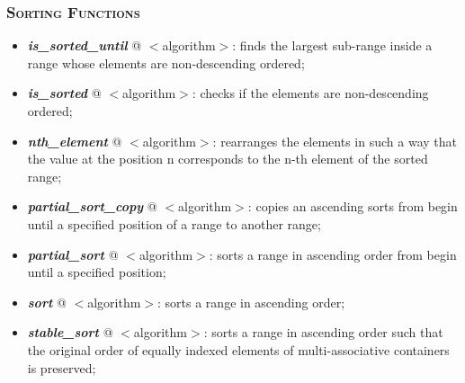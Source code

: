 \documentclass[10pt]{article}
\begin{document}
\begin{multicols*}{5}
{\subsubsection*{\textsc{Sorting Functions}} 
\begin{itemize}[leftmargin=*,topsep=0.25pt]
  \setlength\itemsep{-1.8pt}
	\item  \emph{\textbf{is\_sorted\_until}} @ $<$algorithm$>$: finds the largest sub-range inside a range whose elements are non-descending ordered;
	\item  \emph{\textbf{is\_sorted}} @ $<$algorithm$>$: checks if the elements are non-descending ordered;
	\item  \emph{\textbf{nth\_element}} @ $<$algorithm$>$: rearranges the elements in such a way that the value at the position n corresponds to the n-th element of the sorted range;
	\item  \emph{\textbf{partial\_sort\_copy}} @ $<$algorithm$>$: copies an ascending sorts from begin until a specified position of a range to another range;
	\item  \emph{\textbf{partial\_sort}} @ $<$algorithm$>$: sorts a range in ascending order from begin until a specified position;
	\item  \emph{\textbf{sort}} @ $<$algorithm$>$: sorts a range in ascending order;
	\item  \emph{\textbf{stable\_sort}} @ $<$algorithm$>$: sorts a range in ascending order such that the original order of equally indexed elements of multi-associative containers is preserved;
\end{itemize}

}
\end{multicols*}
\end{document}
